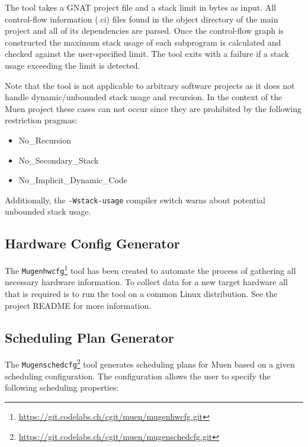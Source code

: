 \documentclass[a4paper,twoside,titlepage]{article}
\begin{document}
The tool takes a GNAT project file and a stack limit in bytes as input.  All
control-flow information (.ci) files found in the object directory of the main
project and all of its dependencies are parsed. Once the control-flow graph is
constructed the maximum stack usage of each subprogram is calculated and
checked against the user-specified limit. The tool exits with a failure if a
stack usage exceeding the limit is detected.

Note that the tool is not applicable to arbitrary software projects
as it does not handle dynamic/unbounded stack usage and recursion. In the
context of the Muen project these cases can not occur since they are prohibited
by the following restriction pragmas:
\begin{itemize}
	\item No\_Recursion
	\item No\_Secondary\_Stack
	\item No\_Implicit\_Dynamic\_Code
\end{itemize}

Additionally, the \texttt{-Wstack-usage} compiler switch warns about potential
unbounded stack usage.

\subsection{Hardware Config Generator}
\label{sec:mugenhwcfg}
The
\texttt{Mugenhwcfg}\footnote{\url{https://git.codelabs.ch/cgit/muen/mugenhwcfg.git}}
tool has been created to automate the process of gathering all necessary
hardware information. To collect data for a new target hardware all that is
required is to run the tool on a common Linux distribution. See the project
README for more information.

\subsection{Scheduling Plan Generator}
\label{sec:mugenschedcfg}
The
\texttt{Mugenschedcfg}\footnote{\url{https://git.codelabs.ch/cgit/muen/mugenschedcfg.git}}
tool generates scheduling plans for Muen based on a given scheduling
configuration.  The configuration allows the user to specify the following
scheduling properties:
\end{document}
